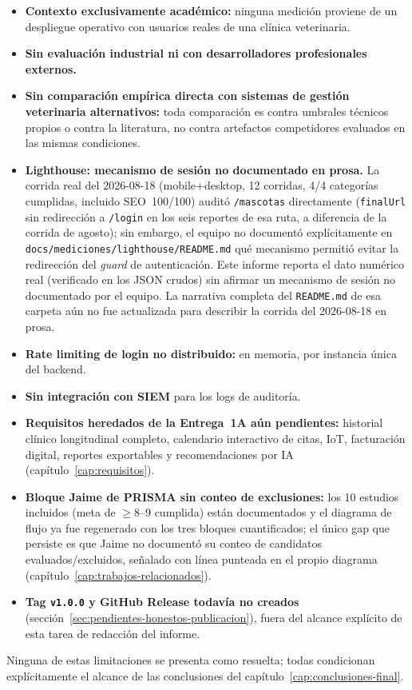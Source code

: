 \begin{itemize}[nosep]
  \item \textbf{Contexto exclusivamente acad\'emico:} ninguna medici\'on
    proviene de un despliegue operativo con usuarios reales de una
    cl\'inica veterinaria.
  \item \textbf{Sin evaluaci\'on industrial ni con desarrolladores
    profesionales externos.}
  \item \textbf{Sin comparaci\'on emp\'irica directa con sistemas de
    gesti\'on veterinaria alternativos:} toda comparaci\'on es contra
    umbrales t\'ecnicos propios o contra la literatura, no contra artefactos
    competidores evaluados en las mismas condiciones.
  \item \textbf{Lighthouse: mecanismo de sesi\'on no documentado en
    prosa.} La corrida real del 2026-08-18 (mobile+desktop, 12 corridas,
    4/4 categor\'ias cumplidas, incluido SEO~100/100) audit\'o
    \texttt{/mascotas} directamente (\texttt{finalUrl} sin redirecci\'on a
    \texttt{/login} en los seis reportes de esa ruta, a diferencia de la
    corrida de agosto); sin embargo, el equipo no document\'o
    expl\'icitamente en \texttt{docs/mediciones/lighthouse/README.md} qu\'e
    mecanismo permiti\'o evitar la redirecci\'on del \emph{guard} de
    autenticaci\'on. Este informe reporta el dato num\'erico real
    (verificado en los JSON crudos) sin afirmar un mecanismo de sesi\'on no
    documentado por el equipo. La narrativa completa del
    \texttt{README.md} de esa carpeta a\'un no fue actualizada para
    describir la corrida del 2026-08-18 en prosa.
  \item \textbf{Rate limiting de login no distribuido:} en memoria, por
    instancia \'unica del backend.
  \item \textbf{Sin integraci\'on con SIEM} para los logs de auditor\'ia.
  \item \textbf{Requisitos heredados de la Entrega~1A a\'un pendientes:}
    historial cl\'inico longitudinal completo, calendario interactivo de
    citas, IoT, facturaci\'on digital, reportes exportables y
    recomendaciones por IA (cap\'itulo~\ref{cap:requisitos}).
  \item \textbf{Bloque Jaime de PRISMA sin conteo de exclusiones:} los 10
    estudios incluidos (meta de $\geq$8--9 cumplida) est\'an documentados y
    el diagrama de flujo ya fue regenerado con los tres bloques
    cuantificados; el \'unico gap que persiste es que Jaime no document\'o
    su conteo de candidatos evaluados/excluidos, se\~nalado con l\'inea
    punteada en el propio diagrama (cap\'itulo~\ref{cap:trabajos-relacionados}).
  \item \textbf{Tag \texttt{v1.0.0} y GitHub Release todav\'ia no creados}
    (secci\'on~\ref{sec:pendientes-honestos-publicacion}), fuera del
    alcance expl\'icito de esta tarea de redacci\'on del informe.
\end{itemize}

Ninguna de estas limitaciones se presenta como resuelta; todas condicionan
expl\'icitamente el alcance de las conclusiones del
cap\'itulo~\ref{cap:conclusiones-final}.
